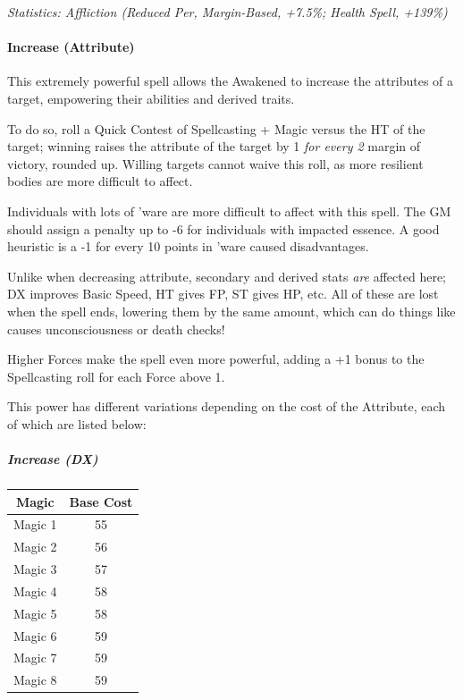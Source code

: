 \begin{multicols*}{3}
	\textcolor{OliveGreen}{\textit{Statistics: Affliction (Reduced Per, Margin-Based, +7.5\%; Health Spell, +139\%) }}
		
	\paragraph{Increase (Attribute)}
	
	This extremely powerful spell allows the Awakened to increase the attributes of a target, empowering their abilities and derived traits.
	
	To do so, roll a Quick Contest of Spellcasting + Magic versus the HT of the target; winning raises the attribute of the target by 1 \textit{for every 2} margin of victory, rounded up. Willing targets cannot waive this roll, as more resilient bodies are more difficult to affect.
	
	Individuals with lots of 'ware are more difficult to affect with this spell. The GM should assign a penalty up to -6 for individuals with impacted essence. A good heuristic is a -1 for every 10 points in 'ware caused disadvantages.
	
	Unlike when decreasing attribute, secondary and derived stats \textit{are} affected here; DX improves Basic Speed, HT gives FP, ST gives HP, etc. All of these are lost when the spell ends, lowering them by the same amount, which can do things like causes unconsciousness or death checks!
	
	Higher Forces make the spell even more powerful, adding a +1 bonus to the Spellcasting roll for each Force above 1.
	
	This power has different variations depending on the cost of the Attribute, each of which are listed below:
		
	\subparagraph{Increase (DX)}
	
	\begin{center}
		\begin{tabular}{|c|c|}
			\hline
			Magic & Base Cost \\
			\hline
			\hline
			Magic 1 & 55 \\
			Magic 2 & 56 \\
			Magic 3 & 57 \\
			Magic 4 & 58 \\
			Magic 5 & 58 \\
			Magic 6 & 59 \\
			Magic 7 & 59 \\
			Magic 8 & 59 \\
			\hline
		\end{tabular}
	\end{center}	
	

\end{multicols*}
